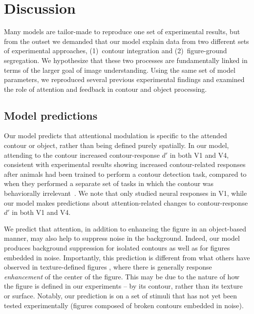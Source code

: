 \section{Discussion}
\label{sec:discussion}
%
Many models are tailor-made to reproduce one set of experimental results,
but from the outset we demanded
that our model explain data from two
different sets of experimental approaches, (1)~contour integration and
(2)~figure-ground segregation. 
We hypothesize that these two processes are 
 fundamentally linked in terms of the larger goal of image understanding.
Using the same set of model parameters, we reproduced several previous
experimental findings and examined the role of attention and feedback
in contour and object processing. 

\subsection{Model predictions}
Our model predicts that attentional modulation is specific to the
attended contour or object, 
rather than being defined purely
spatially. In our model, attending to the contour increased
contour-response $d'$ in both V1 and V4, consistent with experimental
results showing increased contour-related responses after animals had
been trained to perform a contour detection task, compared to when
they performed a separate set of tasks in which the contour was
behaviorally irrelevant~\citep{Li_etal08a}.  We note that
\cite{Li_etal08a} only studied neural responses in V1, while our model
makes predictions about attention-related changes to contour-response
$d'$ in both V1 and V4.

We predict that attention, in addition to enhancing the figure in an
object-based manner, may also help to suppress noise in the
background. Indeed, our model produces background suppression for
isolated contours as well as for figures embedded in noise.
Importantly, this prediction is different from what others have
observed in texture-defined figures \citep{Lamme95,Lee_etal98a}, where
there is generally response {\em enhancement} of the center of the
figure. This may be due to the nature of how the figure is defined in
our experiments -- by its contour, rather than its texture or surface.
Notably, our prediction is on a set of stimuli that has not yet been
tested experimentally (figures composed of broken contours embedded in noise).

